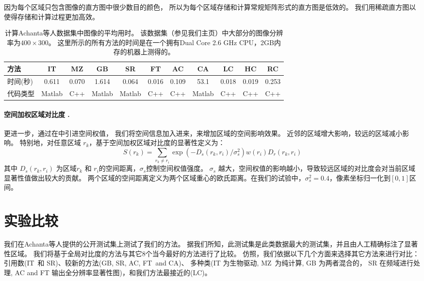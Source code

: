 \documentclass[final]{cvpr}
\newcommand{\IT}{IT\cite{98pami/Itti}}
\newcommand{\MZ}{MZ\cite{03ACMMM/Ma_Contrast-based}}
\newcommand{\GB}{GB\cite{conf/nips/HarelKP06}}
\newcommand{\SR}{SR\cite{07cvpr/hou_SpectralResidual}}
\newcommand{\FT}{FT\cite{09cvpr/Achanta_FTSaliency}}
\newcommand{\CA}{CA\cite{10cvpr/goferman_context}}
\newcommand{\LC}{LC\cite{06acmmm/ZhaiS_spatiotemporal}}
\newcommand{\AC}{AC\cite{08cvs/achanta_salient}}
\newcommand{\mypara}[1]{\paragraph{#1.}}
\begin{document}
因为每个区域只包含图像的直方图中很少数目的颜色，
所以为每个区域存储和计算常规矩阵形式的直方图是低效的。
我们用稀疏直方图以使得存储和计算过程更加高效。



\begin{table}
    \centering
    \begin{tabular}{l|c|c|c|c|c|c|c|c|c|c} \hline\hline
      方法  &  \IT   &  \MZ  &   \GB  &  \SR   &  \FT  &  \AC  &  \CA   & \LC   &  HC   &  RC   \\ \hline
      时间(秒) & 0.611  & 0.070 & 1.614  & 0.064  & 0.016 & 0.109 &  53.1  & 0.018 & 0.019 & 0.253 \\ \hline
      代码类型    & Matlab & C++   & Matlab & Matlab &  C++  &  C++  & Matlab &  C++  &  C++  &  C++  \\ \hline\hline
    \end{tabular}
    \caption{计算Achanta等人数据集\cite{09cvpr/Achanta_FTSaliency}中图像的平均用时。
        该数据集（参见我们主页）中大部分的图像分辨率为$400\times300$。
        这里所示的所有方法的时间是在一个拥有Dual Core 2.6 GHz
        CPU，2GB内存的机器上测得的。
    } \label{tab:TimeEfficency}
\end{table}


\mypara{空间加权区域对比度 }
更进一步，通过在中引进空间权值，
我们将空间信息加入进来，来增加区域的空间影响效果。
近邻的区域增大影响，较远的区域减小影响。
特别地，对任意区域 $r_k$，基于空间加权区域对比度的显著性定义为：
\begin{equation}\label{equ:regContrastSpatial}
    S(r_k)=\sum_{r_k\neq r_i}\exp({-D_s(r_k,r_i)/\sigma_s^2})w(r_i) D_r(r_k, r_i)
\end{equation}
其中 $D_s(r_k, r_i)$ 为区域$r_k$ 和 $r_i$的空间距离，$\sigma_s$控制空间权值强度。
$\sigma_s$ 越大，空间权值的影响越小，导致较远区域的对比度会对当前区域显著性值做出较大的贡献。
两个区域的空间距离定义为两个区域重心的欧氏距离。在我们的试验中，$\sigma_s^2 = 0.4$，像素坐标归一化到$[0, 1]$区间。


\section{实验比较}\label{sec:Experiment}


我们在Achanta等人提供的公开测试集\cite{09cvpr/Achanta_FTSaliency}上测试了我们的方法。
据我们所知，此测试集是此类数据最大的测试集，并且由人工精确标注了显著性区域。
我们将基于全局对比度的方法与其它$8$个当今最好的方法进行了比较。
仿照\cite{09cvpr/Achanta_FTSaliency}，我们依据以下几个方面来选择其它方法来进行对比：
引用数(\IT ~和 \SR)、较新的方法(\GB, SR, \AC, \FT ~and \CA)、
多种类(IT 为生物驱动, \MZ~为纯计算, GB 为两者混合的， SR 在频域进行处理,
AC and FT 输出全分辨率显著性图)，和我们方法最接近的(\LC)。
\end{document}
